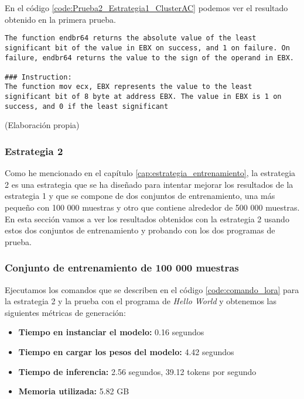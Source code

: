 En el código \ref{code:Prueba2_Estrategia1_ClusterAC} podemos ver el resultado obtenido
en la primera prueba.

\begin{mycode}
    \begin{verbatim}
The function endbr64 returns the absolute value of the least significant bit of the value in EBX on success, and 1 on failure. On failure, endbr64 returns the value to the sign of the operand in EBX.

### Instruction:
The function mov ecx, EBX represents the value to the least significant bit of 8 byte at address EBX. The value in EBX is 1 on success, and 0 if the least significant
    \end{verbatim}
    \caption[]{ (Elaboración propia)}
    \label{code:Prueba2_Estrategia1_ClusterAC}
\end{mycode}

\subsubsection{Estrategia 2}
\label{subsubsec:resultados:estrategia_2}


Como he mencionado en el capítulo \ref{cap:estrategia_entrenamiento}, la estrategia 2
es una estrategia que se ha diseñado para intentar mejorar los resultados de la estrategia 1
y que se compone de dos conjuntos de entrenamiento, una más pequeño con 100 000 muestras y otro
que contiene alrededor de 500 000 muestras. En esta sección vamos a ver los resultados obtenidos
con la estrategia 2 usando estos dos conjuntos de entrenamiento y probando con los dos programas
de prueba.

\subsubsection{Conjunto de entrenamiento de 100 000 muestras}

Ejecutamos los comandos que se describen en el código \ref{code:comando_lora} para
la estrategia 2 y la prueba con el programa de \textit{Hello World} y obtenemos
las siguientes métricas de generación:

\begin{itemize}
    \item \textbf{Tiempo en instanciar el modelo:} 0.16 segundos
    \item \textbf{Tiempo en cargar los pesos del modelo:} 4.42 segundos
    \item \textbf{Tiempo de inferencia:} 2.56 segundos, 39.12 tokens por segundo
    \item \textbf{Memoria utilizada:} 5.82 GB
\end{itemize}

